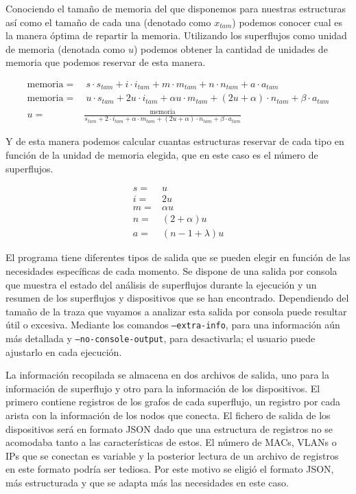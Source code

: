 \documentclass[tfg,epsbased,lof,lot,loa,covers,final,copyright,overleaf]{tfgtfmthesisuam}
\begin{document}
Conociendo el tamaño de memoria del que disponemos para nuestras estructuras así como el tamaño de cada una (denotado como $x_{tam}$) podemos conocer cual es la manera óptima de repartir la memoria. Utilizando los superflujos como unidad de memoria (denotada como $u$) podemos obtener la cantidad de unidades de memoria que podemos reservar de esta manera.

\begin{align*}
	\mathrm{memoria}  = &\  s \cdot s_{tam} + i \cdot i_{tam} + m \cdot m_{tam} + n \cdot n_{tam} + a \cdot a_{tam}\\
	\mathrm{memoria}  = &\  u \cdot s_{tam} + 2u \cdot i_{tam} + \alpha u \cdot m_{tam} + (2u+\alpha) \cdot n_{tam} + \beta \cdot a_{tam} \\
	u  = & \frac{\mathrm{memoria}}{s_{tam} + 2 \cdot i_{tam} + \alpha \cdot m_{tam} + (2u+\alpha) \cdot n_{tam} + \beta \cdot a_{tam}}
\end{align*}

Y de esta manera podemos calcular cuantas estructuras reservar de cada tipo en función de la unidad de memoria elegida, que en este caso es el número de superflujos.

\begin{align*}
	s =& u\\ 
	i =& 2u\\ 
	m =& \alpha u\\
	n =& (2+\alpha)u\\
	a =& (n - 1 + \lambda) u
\end{align*}

El programa tiene diferentes tipos de salida que se pueden elegir en función de las necesidades específicas de cada momento. Se dispone de una salida por consola que muestra el estado del análisis de superflujos durante la ejecución y un resumen de los superflujos y dispositivos que se han encontrado. Dependiendo del tamaño de la traza que vayamos a analizar esta salida por consola puede resultar útil o excesiva. Mediante los comandos \texttt{--extra-info}, para una información aún más detallada y \texttt{--no-console-output}, para desactivarla; el usuario puede ajustarlo en cada ejecución.

La información recopilada se almacena en dos archivos de salida, uno para la información de superflujo y otro para la información de los dispositivos. El primero contiene registros de los grafos de cada superflujo, un registro por cada arista con la información de los nodos que conecta. El fichero de salida de los dispositivos será en formato JSON dado que una estructura de registros no se acomodaba tanto a las características de estos. El número de MACs, VLANs o IPs que se conectan es variable y la posterior lectura de un archivo de registros en este formato podría ser tediosa. Por este motivo se eligió el formato JSON, más estructurada y que se adapta más las necesidades en este caso.
\end{document}
